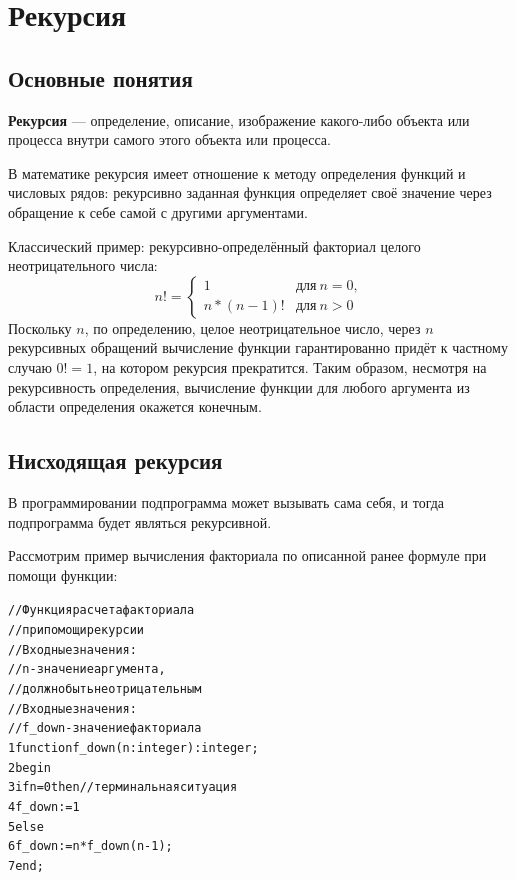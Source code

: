 \documentclass[12pt,a4paper]{article}
\begin{document}

\setcounter{section}{13}
\section{Рекурсия}

\subsection{Основные понятия}

\textbf{Рекурсия} ---  определение, описание, изображение какого-либо объекта или процесса внутри самого этого объекта или процесса.

В математике рекурсия имеет отношение к методу определения функций и числовых рядов: рекурсивно заданная функция определяет своё значение через обращение к себе самой с другими аргументами. 

Классический пример: рекурсивно-определённый факториал целого неотрицательного числа:
$$
n!= \begin{cases}
	1 & \text{для}\ n=0,\\
	n*(n-1)! & \text{для}\ n>0
	\end{cases}
$$
Поскольку $n$, по определению, целое неотрицательное число, через $n$ рекурсивных обращений вычисление функции гарантированно придёт к частному случаю $0!=1$, на котором рекурсия прекратится. Таким образом, несмотря на рекурсивность определения, вычисление функции для любого аргумента из области определения окажется конечным.

\subsection{Нисходящая рекурсия}

В программировании подпрограмма может вызывать сама себя, и тогда подпрограмма будет являться рекурсивной.

Рассмотрим пример вычисления факториала по описанной ранее формуле при помощи функции:

\begin{alltt}
//Функция расчета факториала
//при помощи рекурсии
//Входные значения:
//  n - значение аргумента,
//      должно быть неотрицательным
//Входные значения:
//  f\_down - значение факториала
1 function f\_down(n: integer):integer;
2 begin
3  if n = 0 then //терминальная ситуация
4    f\_down := 1
5  else
6    f\_down := n * f\_down(n - 1);
7 end;
\end{alltt}
\end{document}
